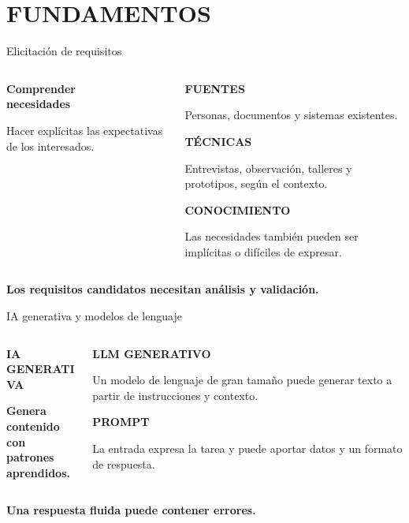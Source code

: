 \documentclass[aspectratio=169,12pt]{beamer}
\newcommand{\etiqueta}[1]{{\fontsize{7.5}{9}\selectfont\bfseries\color{Accent}#1\par}}
\newcommand{\texto}[1]{{\fontsize{11}{14}\selectfont #1\par}}
\newcommand{\fuentesactuales}{}
\newcommand{\fuentesdiapositiva}[1]{\gdef\fuentesactuales{#1}}
\begin{document}
\section{FUNDAMENTOS}
\begin{frame}[t]{Elicitación de requisitos}
\fuentesdiapositiva{\cite{ireb2026foundation} IREB, 2026\qquad
  \cite{washizaki2024swebok} SWEBOK, 2024}
\begin{columns}[T,onlytextwidth]
\begin{column}{0.47\textwidth}
{\fontsize{23}{27}\selectfont\bfseries Comprender\\necesidades\par}
\vspace{4mm}
\texto{Hacer explícitas las expectativas de los interesados.}
\end{column}
\begin{column}{0.45\textwidth}
\etiqueta{FUENTES}
\texto{Personas, documentos y sistemas existentes.}
\vspace{2.5mm}
\etiqueta{TÉCNICAS}
\texto{Entrevistas, observación, talleres y prototipos, según el contexto.}
\vspace{2.5mm}
\etiqueta{CONOCIMIENTO}
\texto{Las necesidades también pueden ser implícitas o difíciles de expresar.}
\end{column}
\end{columns}
\vfill
{\fontsize{10}{13}\selectfont\bfseries\color{Accent}Los requisitos candidatos necesitan análisis y validación.\par}
\vspace{2mm}
\end{frame}
\begin{frame}[t]{IA generativa y modelos de lenguaje}
\fuentesdiapositiva{\cite{cheng2026genai} Cheng et al., 2026\qquad
  \cite{vogelsang2025guideline} Vogelsang y Fischbach, 2025}
\vspace{2mm}
\begin{columns}[T,onlytextwidth]
\begin{column}{0.46\textwidth}
\etiqueta{IA GENERATIVA}
\vspace{2mm}
{\fontsize{20}{24}\selectfont\bfseries Genera contenido\\con patrones\\aprendidos.\par}
\end{column}
\begin{column}{0.46\textwidth}
\etiqueta{LLM GENERATIVO}
\vspace{2mm}
\texto{Un modelo de lenguaje de gran tamaño puede generar texto a partir de instrucciones y contexto.}
\vspace{2mm}
\etiqueta{PROMPT}
\texto{La entrada expresa la tarea y puede aportar datos y un formato de respuesta.}
\end{column}
\end{columns}
\vfill
{\fontsize{10}{13}\selectfont\bfseries\color{Accent}Una respuesta fluida puede contener errores.\par}
\vspace{2mm}
\end{frame}
\end{document}
